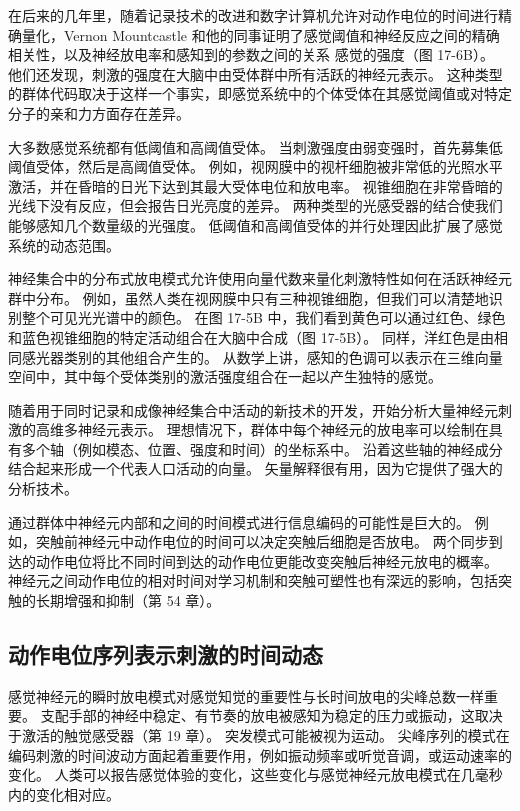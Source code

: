 在后来的几年里，随着记录技术的改进和数字计算机允许对动作电位的时间进行精确量化，Vernon Mountcastle 和他的同事证明了感觉阈值和神经反应之间的精确相关性，以及神经放电率和感知到的参数之间的关系 感觉的强度（图 17-6B）。 他们还发现，刺激的强度在大脑中由受体群中所有活跃的神经元表示。 这种类型的群体代码取决于这样一个事实，即感觉系统中的个体受体在其感觉阈值或对特定分子的亲和力方面存在差异。

大多数感觉系统都有低阈值和高阈值受体。 当刺激强度由弱变强时，首先募集低阈值受体，然后是高阈值受体。 例如，视网膜中的视杆细胞被非常低的光照水平激活，并在昏暗的日光下达到其最大受体电位和放电率。 视锥细胞在非常昏暗的光线下没有反应，但会报告日光亮度的差异。 两种类型的光感受器的结合使我们能够感知几个数量级的光强度。 低阈值和高阈值受体的并行处理因此扩展了感觉系统的动态范围。

神经集合中的分布式放电模式允许使用向量代数来量化刺激特性如何在活跃神经元群中分布。 例如，虽然人类在视网膜中只有三种视锥细胞，但我们可以清楚地识别整个可见光光谱中的颜色。 在图 17-5B 中，我们看到黄色可以通过红色、绿色和蓝色视锥细胞的特定活动组合在大脑中合成（图 17-5B）。 同样，洋红色是由相同感光器类别的其他组合产生的。 从数学上讲，感知的色调可以表示在三维向量空间中，其中每个受体类别的激活强度组合在一起以产生独特的感觉。

随着用于同时记录和成像神经集合中活动的新技术的开发，开始分析大量神经元刺激的高维多神经元表示。 理想情况下，群体中每个神经元的放电率可以绘制在具有多个轴（例如模态、位置、强度和时间）的坐标系中。 沿着这些轴的神经成分结合起来形成一个代表人口活动的向量。 矢量解释很有用，因为它提供了强大的分析技术。

通过群体中神经元内部和之间的时间模式进行信息编码的可能性是巨大的。 例如，突触前神经元中动作电位的时间可以决定突触后细胞是否放电。 两个同步到达的动作电位将比不同时间到达的动作电位更能改变突触后神经元放电的概率。 神经元之间动作电位的相对时间对学习机制和突触可塑性也有深远的影响，包括突触的长期增强和抑制（第 54 章）。


\subsection{动作电位序列表示刺激的时间动态}

感觉神经元的瞬时放电模式对感觉知觉的重要性与长时间放电的尖峰总数一样重要。 支配手部的神经中稳定、有节奏的放电被感知为稳定的压力或振动，这取决于激活的触觉感受器（第 19 章）。 突发模式可能被视为运动。 尖峰序列的模式在编码刺激的时间波动方面起着重要作用，例如振动频率或听觉音调，或运动速率的变化。 人类可以报告感觉体验的变化，这些变化与感觉神经元放电模式在几毫秒内的变化相对应。

